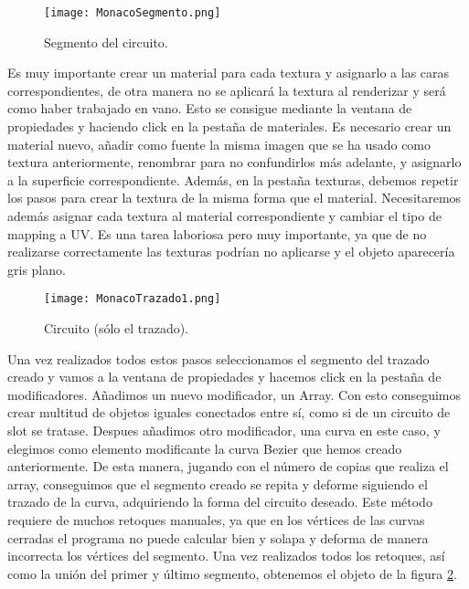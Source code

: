 \begin{figure}[h]
	\centering
	\texttt{[image: MonacoSegmento.png]}
	\caption{Segmento del circuito.} \label{fig:monacosegmento}
\end{figure}

Es muy importante crear un material para cada textura y asignarlo a las caras correspondientes, de otra manera no se aplicará la textura al renderizar y será como haber trabajado en vano. Esto se consigue mediante la ventana de propiedades y haciendo click en la pestaña de materiales. Es necesario crear un material nuevo, añadir como fuente la misma imagen que se ha usado como textura anteriormente, renombrar para no confundirlos más adelante, y asignarlo a la superficie correspondiente. Además, en la pestaña texturas, debemos repetir los pasos para crear la textura de la misma forma que el material. Necesitaremos además asignar cada textura al material correspondiente y cambiar el tipo de mapping a UV. Es una tarea laboriosa pero muy importante, ya que de no realizarse correctamente las texturas podrían no aplicarse y el objeto aparecería gris plano.

\begin{figure}[hb]
	\centering
	\texttt{[image: MonacoTrazado1.png]}
	\caption{Circuito (sólo el trazado).} \label{fig:monacotrazado1}
\end{figure}

Una vez realizados todos estos pasos seleccionamos el segmento del trazado creado y vamos a la ventana de propiedades y hacemos click en la pestaña de modificadores. Añadimos un nuevo modificador, un Array. Con esto conseguimos crear multitud de objetos iguales conectados entre sí, como si de un circuito de slot se tratase. Despues añadimos otro modificador, una curva en este caso, y elegimos como elemento modificante la curva Bezier que hemos creado anteriormente. De esta manera, jugando con el número de copias que realiza el array, conseguimos que el segmento creado se repita y deforme siguiendo el trazado de la curva, adquiriendo la forma del circuito deseado. Este método requiere de muchos retoques manuales, ya que en los vértices de las curvas cerradas el programa no puede calcular bien y solapa y deforma de manera incorrecta los vértices del segmento. Una vez realizados todos los retoques, así como la unión del primer y último segmento, obtenemos el objeto de la figura \ref{fig:monacotrazado1}.

